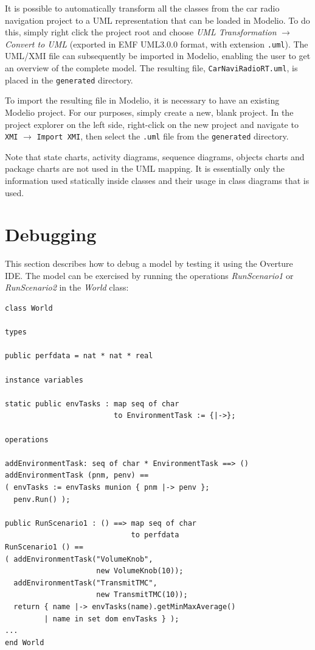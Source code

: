 It is possible to automatically transform all the classes from the car
radio navigation project to a UML representation that can be loaded in Modelio. To do this, simply right
click the project root and choose \emph{UML Transformation} $
\rightarrow $ \emph{Convert to UML} (exported in EMF UML3.0.0 format, with extension \texttt{.uml}). The UML/XMI file can subsequently be
imported in Modelio, enabling the user to get an overview
of the complete model.  The resulting file, \texttt{CarNaviRadioRT.uml}, is placed in the \texttt{generated} directory.

To import the resulting file in Modelio, it is necessary to have an existing Modelio project.  For our purposes, simply create a new, blank project.  In the project explorer on the left side, right-click on the new project and navigate to \texttt{XMI} $\rightarrow$ \texttt{Import XMI}, then select the \texttt{.uml} file from the \texttt{generated} directory.

Note that state charts, activity
diagrams, sequence diagrams, objects charts and package charts are not
used in the UML mapping. It is essentially only the information used
statically inside classes and their usage in class diagrams that is
used.

\section{Debugging}\label{sec:debugging}

This section describes how to debug a model by testing it using the
Overture IDE. The model can be exercised by running the operations
\emph{RunScenario1} or \emph{RunScenario2} in the \emph{World} class:

\begin{lstlisting}
class World

types
  
public perfdata = nat * nat * real

instance variables

static public envTasks : map seq of char 
                         to EnvironmentTask := {|->};

operations

addEnvironmentTask: seq of char * EnvironmentTask ==> ()
addEnvironmentTask (pnm, penv) ==
( envTasks := envTasks munion { pnm |-> penv };
  penv.Run() );

public RunScenario1 : () ==> map seq of char 
                             to perfdata
RunScenario1 () ==
( addEnvironmentTask("VolumeKnob", 
                     new VolumeKnob(10));
  addEnvironmentTask("TransmitTMC", 
                     new TransmitTMC(10));
  return { name |-> envTasks(name).getMinMaxAverage() 
         | name in set dom envTasks } );
...
end World
\end{lstlisting}

